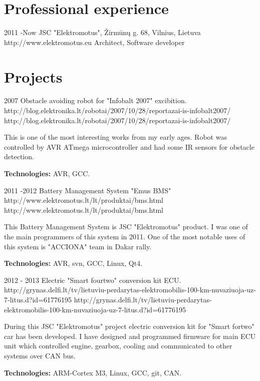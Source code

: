 \documentclass[12]{article}
\begin{document}

\section{Professional experience}

\job
{2011 -}{Now}
{JSC "Elektromotus", Žirmūnų g. 68, Vilnius, Lietuva}
{http://www.elektromotus.eu}
{Architect, Software developer}
{
}


\section{Projects}

\job
{2007}{}
{Obstacle avoiding robot for "Infobalt 2007" excibition.}
{http://blog.elektronika.lt/robotai/2007/10/28/reportazai-is-infobalt2007/}
{http://blog.elektronika.lt/robotai/2007/10/28/reportazai-is-infobalt2007/}
{This is one of the most interesting works from my early ages.
Robot was controlled by AVR ATmega microcontroller and had some IR sensors for obstacle detection. \\
\rule{0mm}{5mm}\textbf{Technologies:} AVR, GCC.}


\job
{2011 -}{2012}
{Battery Management System "Emus BMS"}
{http://www.elektromotus.lt/lt/produktai/bms.html}
{http://www.elektromotus.lt/lt/produktai/bms.html}
{
This Battery Management System is JSC "Elektromotus" product.
I was one of the main programmers of this system in 2011.
One of the most notable uses of this system is "ACCIONA" team in Dakar rally.\\
\rule{0mm}{5mm}\textbf{Technologies:} AVR, svn, GCC, Linux, Qt4.}

\job
{2012 - }{2013}
{Electric "Smart fourtwo" conversion kit ECU.}
{http://grynas.delfi.lt/tv/lietuviu-perdarytas-elektromobilis-100-km-nuvaziuoja-uz-7-litus.d?id=61776195}
{http://grynas.delfi.lt/tv/lietuviu-perdarytas-elektromobilis-100-km-nuvaziuoja-uz-7-litus.d?id=61776195}
{
During this JSC "Elektromotus" project electric conversion kit for "Smart fortwo" car has been developed.
I have designed and programmed firmware for main ECU unit which controlled engine, gearbox, cooling and communicated to other systems over CAN bus.\\
\rule{0mm}{5mm}\textbf{Technologies:} ARM-Cortex M3, Linux, GCC, git, CAN.}
\end{document}
